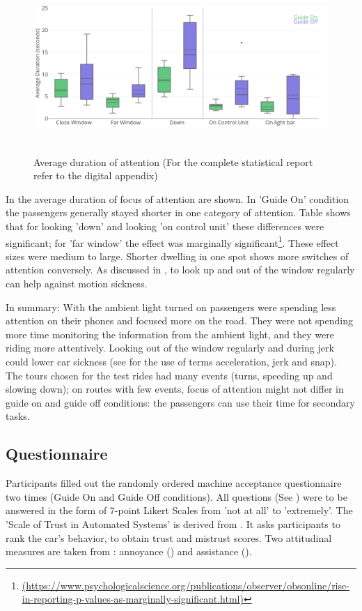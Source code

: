 \begin{figure}
    \includegraphics[width=1\textwidth]{fig/Average.png}\hfill\
    \caption[Average Duration of Attention]{Average duration of attention (For the complete statistical report refer to the digital appendix)}
    \label{fig:attentionAverage}
\end{figure}


In \emph{} the average duration of focus of attention are shown. In 'Guide On' condition the passengers generally stayed shorter in one category of attention. Table \emph{} shows that for looking 'down' and looking 'on control unit' these differences were significant; for 'far window' the effect was marginally significant\footnote{\url{(https://www.psychologicalscience.org/publications/observer/obsonline/rise-in-reporting-p-values-as-marginally-significant.html)}}. These effect sizes were medium to large. Shorter dwelling in one spot shows more switches of attention conversely. As discussed in \emph{}, to look up and out of the window regularly can help against motion sickness. 

In summary: With the ambient light turned on passengers were spending less attention on their phones and focused more on the road. They were not spending more time monitoring the information from the ambient light, and they were riding more attentively. Looking out of the window regularly and during jerk could lower car sickness (see \citep{Eager2016BeyondDerivatives} for the use of terms acceleration, jerk and snap). The tours chosen for the test rides had many events (turns, speeding up and slowing down); on routes with few events, focus of attention might not differ in guide on and guide off conditions: the passengers can use their time for secondary tasks. 

\subsection{Questionnaire}
\label{ssec:questionaire}
Participants filled out the randomly ordered machine acceptance questionnaire two times (Guide On and Guide Off conditions). All questions (See  \emph{}) were to be answered in the form of 7-point Likert Scales from 'not at all' to 'extremely'. The 'Scale of Trust in Automated Systems' is derived from \cite{Jian2010}. It asks participants to rank the car's behavior, to obtain trust and mistrust scores. Two attitudinal measures are taken from \cite{Koo2015}: annoyance () and assistance (). 

